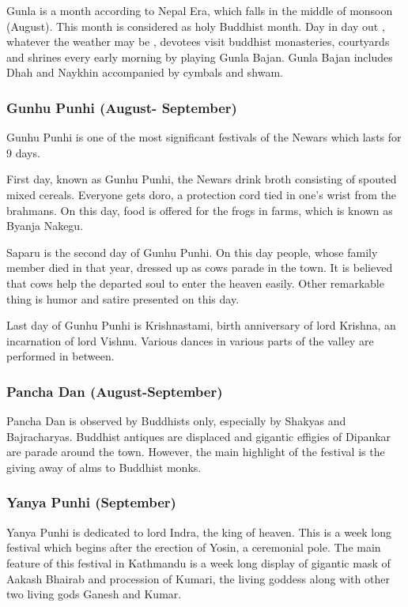 \documentclass[a4paper,13pt, margin=0.9in]{article}
\begin{document}
\begin{flushleft}
	Gunla is a month according to Nepal Era, which falls in the middle of monsoon (August). This month is considered as holy Buddhist month. Day in day out , whatever the weather may be , devotees visit buddhist monasteries, courtyards and shrines every early morning by playing Gunla Bajan. Gunla Bajan includes Dhah and Naykhin accompanied by cymbals and shwam.

	\subsubsection{Gunhu Punhi (August- September)}

	Gunhu Punhi is one of the most significant festivals of the Newars which lasts for 9 days.

	First day, known as Gunhu Punhi, the Newars drink broth consisting of spouted mixed cereals. Everyone gets doro, a protection cord tied in one's wrist from the brahmans. On this day, food is offered for the frogs in farms, which is known as Byanja Nakegu.

	Saparu is the second day of Gunhu Punhi. On this day people, whose family member died in that year, dressed up as cows parade in the town. It is believed that cows help the departed soul to enter the heaven easily. Other remarkable thing is humor and satire presented on this day.

	Last day of Gunhu Punhi is Krishnastami, birth anniversary of lord Krishna, an incarnation of lord Vishnu. Various dances in various parts of the valley are performed in between.

	\subsubsection{Pancha Dan (August-September)}

	Pancha Dan is observed by Buddhists only, especially by Shakyas and Bajracharyas. Buddhist antiques are displaced and gigantic effigies of Dipankar are parade around the town. However, the main highlight of the festival is the giving away of alms to Buddhist monks.

	\subsubsection{Yanya Punhi (September)}

	Yanya Punhi is dedicated to lord Indra, the king of heaven. This is a week long festival which begins after the erection of Yosin, a ceremonial pole. The main feature of this festival in Kathmandu is a week long display of gigantic mask of Aakash Bhairab and procession of Kumari, the living goddess along with other two living gods Ganesh and Kumar.


\end{flushleft}
\end{document}
